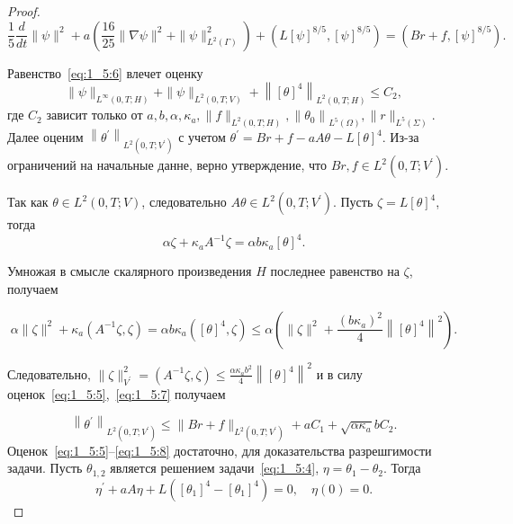 \begin{proof}
    \begin{equation}
        \label{eq:1_5:6}
        \frac{1}{5} \frac{d}{d t}\|\psi\|^{2}
        +a\left(\frac{16}{25}\|\nabla \psi\|^{2}+\|\psi\|_{L^{2}(\Gamma)}^{2}\right)
        +\left(L[\psi]^{8 / 5},[\psi]^{8 / 5}\right)
        =\left(B r+f,[\psi]^{8 / 5}\right).
    \end{equation}


    Равенство~\eqref{eq:1_5:6} влечет оценку
    \begin{equation}
        \label{eq:1_5:7}
        \|\psi\|_{L^{\infty}(0, T ; H)}+\|\psi\|_{L^{2}(0, T ; V)}
        +\left\|[\theta]^{4}\right\|_{L^{2}(0, T ; H)} \leq C_{2},
    \end{equation}
    где $C_2$ зависит только от
    $a, b, \alpha, \kappa_{a},\|f\|_{L^{2}(0, T ; H)},
    \left\|\theta_{0}\right\|_{L^{5}(\Omega)},\|r\|_{L^{5}(\Sigma)}$.
    Далее оценим $\left\|\theta^{\prime}\right\|_{L^{2}\left(0, T ; V^{\prime}\right)}$
    с учетом $\theta^{\prime}=B r+f-a A \theta-L[\theta]^{4}$.
    Из-за ограничений на начальные данне, верно утверждение,
    что $B r, f \in L^{2}\left(0, T ; V^{\prime}\right)$.

    Так как $\theta \in L^{2}(0, T ; V)$,
    следовательно $A \theta \in L^{2}\left(0, T ; V^{\prime}\right)$.
    Пусть $\zeta=L[\theta]^{4}$, тогда
    \[
        \alpha \zeta+\kappa_{a} A^{-1} \zeta=\alpha b \kappa_{a}[\theta]^{4}.
    \]

    Умножая в смысле скалярного произведения $H$ последнее равенство на $\zeta$, получаем

    \[
        \alpha\|\zeta\|^{2}+\kappa_{a}\left(A^{-1} \zeta, \zeta\right)
        =\alpha b \kappa_{a}\left([\theta]^{4}, \zeta\right)
        \leq \alpha\left(\|\zeta\|^{2}
        +\frac{\left(b \kappa_{a}\right)^{2}}{4}\left\|[\theta]^{4}\right\|^{2}\right).
    \]

    Следовательно, $\|\zeta\|_{V^{\prime}}^{2}=\left(A^{-1} \zeta,
    \zeta\right) \leq \frac{\alpha \kappa_{a} b^{2}}{4}\left\|[\theta]^{4}\right\|^{2}$
    и в силу оценок~\eqref{eq:1_5:5},~\eqref{eq:1_5:7} получаем

    \begin{equation}
        \label{eq:1_5:8}
        \left\|\theta^{\prime}\right\|_{L^{2}\left(0, T ; V^{\prime}\right)}
        \leq\|B r+f\|_{L^{2}\left(0, T ; V^{\prime}\right)}
        +a C_{1}+\sqrt{\alpha \kappa_{a}} b C_{2}.
    \end{equation}
    Оценок~\eqref{eq:1_5:5}--\eqref{eq:1_5:8} достаточно, для доказательства разрешгимости задачи.
    Пусть $\theta_{1,2}$ является решением задачи~\eqref{eq:1_5:4}, $\eta=\theta_{1}-\theta_{2}$.
    Тогда
    \[
        \eta^{\prime}+a A \eta+L\left(\left[\theta_{1}\right]^{4}-
        \left[\theta_{1}\right]^{4}\right)=0, \quad \eta(0)=0.
    \]


\end{proof}
